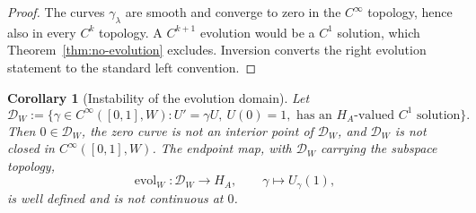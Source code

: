 \documentclass[11pt]{article}
\newtheorem{corollary}[theorem]{Corollary}
\theoremstyle{remark}
\begin{document}
\begin{proof}
The curves $\gamma_\lambda$ are smooth and converge to zero in the
$C^\infty$ topology, hence also in every $C^k$ topology.  A
$C^{k+1}$ evolution would be a $C^1$ solution, which
Theorem~\ref{thm:no-evolution} excludes.  Inversion converts the right
evolution statement to the standard left convention.
\end{proof}

\begin{corollary}[Instability of the evolution domain]
\label{cor:evolution-domain}
Let
\[
  \mathcal D_W:=\{\gamma\in C^\infty([0,1],W):
  U'=\gamma U,\ U(0)=1,
  \text{ has an $H_A$-valued $C^1$ solution}\}.
\]
Then $0\in\mathcal D_W$, the zero curve is not an interior point of
$\mathcal D_W$, and $\mathcal D_W$ is not closed in
$C^\infty([0,1],W)$.  The endpoint map, with $\mathcal D_W$ carrying the
subspace topology,
\[
  \operatorname{evol}_W:\mathcal D_W\to H_A,
  \qquad \gamma\mapsto U_\gamma(1),
\]
is well defined and is not continuous at $0$.
\end{corollary}
\end{document}
